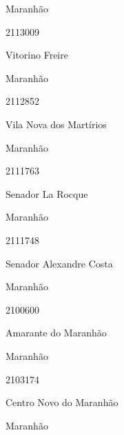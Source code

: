 \documentclass[
  letterpaper,
]{report}
\begin{document}
\n    

\n    

\n      

Maranhão

\n      

2113009

\n      

Vitorino Freire

\n    

\n    

\n      

Maranhão

\n      

2112852

\n      

Vila Nova dos Martírios

\n    

\n    

\n      

Maranhão

\n      

2111763

\n      

Senador La Rocque

\n    

\n    

\n      

Maranhão

\n      

2111748

\n      

Senador Alexandre Costa

\n    

\n    

\n      

Maranhão

\n      

2100600

\n      

Amarante do Maranhão

\n    

\n    

\n      

Maranhão

\n      

2103174

\n      

Centro Novo do Maranhão

\n    

\n    

\n      

Maranhão
\end{document}
